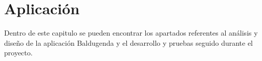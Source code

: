 \chapter{Aplicación}
\label{ch:aplicación}


Dentro de este capitulo se pueden encontrar los apartados referentes al análisis y diseño de la aplicación Baldugenda y el desarrollo y pruebas seguido durante el proyecto.


\newpage
























